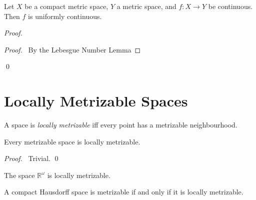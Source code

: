 \begin{thm}
  Let $X$ be a compact metric space, $Y$ a metric space, and $f : X
  \rightarrow Y$ be continuous. Then $f$ is uniformly continuous.
\end{thm}

\begin{proof}
  \pf
  \begin{proof}
    \pf\ By the Lebesgue Number Lemma
  \end{proof}
  \qed
\end{proof}

\section{Locally Metrizable Spaces}

 \begin{df}
 A space is \emph{locally metrizable} iff every point has a metrizable
neighbourhood.
\end{df}

\begin{prop}
Every metrizable space is locally metrizable.
\end{prop}

\begin{proof}
\pf\ Trivial. \qed
\end{proof}

\begin{cor}
 The space $\mathbb{R}^\omega$ is locally metrizable.
\end{cor}

 \begin{prop}
A compact Hausdorff space is metrizable if and only if it is locally
metrizable.
\end{prop}

